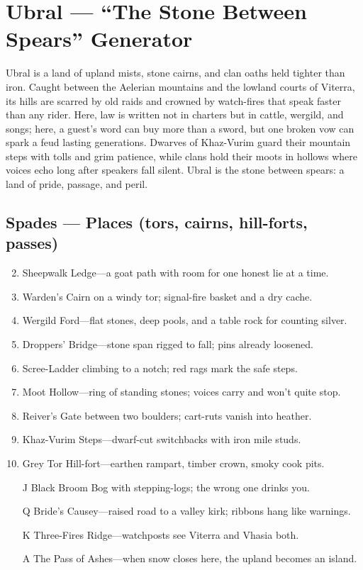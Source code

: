 \section{Ubral --- ``The Stone Between Spears'' Generator}
\label{chap:ubral}

Ubral is a land of upland mists, stone cairns, and clan oaths held tighter than iron. Caught between the Aelerian mountains and the lowland courts of Viterra, its hills are scarred by old raids and crowned by watch-fires that speak faster than any rider. Here, law is written not in charters but in cattle, wergild, and songs; here, a guest’s word can buy more than a sword, but one broken vow can spark a feud lasting generations. Dwarves of Khaz-Vurim guard their mountain steps with tolls and grim patience, while clans hold their moots in hollows where voices echo long after speakers fall silent. Ubral is the stone between spears: a land of pride, passage, and peril.

\subsection*{Spades --- Places (tors, cairns, hill-forts, passes)}
\label{sec:ubral-places}
\begin{enumerate}
\setcounter{enumi}{1}
\item Sheepwalk Ledge---a goat path with room for one honest lie at a time.
\item Warden's Cairn on a windy tor; signal-fire basket and a dry cache.
\item Wergild Ford---flat stones, deep pools, and a table rock for counting silver.
\item Droppers' Bridge---stone span rigged to fall; pins already loosened.
\item Scree-Ladder climbing to a notch; red rags mark the safe steps.
\item Moot Hollow---ring of standing stones; voices carry and won't quite stop.
\item Reiver's Gate between two boulders; cart-ruts vanish into heather.
\item Khaz-Vurim Steps---dwarf-cut switchbacks with iron mile studs.
\item Grey Tor Hill-fort---earthen rampart, timber crown, smoky cook pits.
\item[J] Black Broom Bog with stepping-logs; the wrong one drinks you.
\item[Q] Bride's Causey---raised road to a valley kirk; ribbons hang like warnings.
\item[K] Three-Fires Ridge---watchposts see Viterra and Vhasia both.
\item[A] The Pass of Ashes---when snow closes here, the upland becomes an island.
\end{enumerate}

